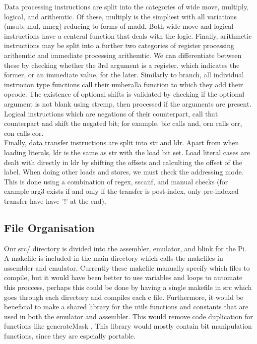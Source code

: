 \documentclass[11pt]{article}
\begin{document}
Data processing instructions are split into the categories of wide move, multiply, logical, and arithemtic. Of these, multiply is the simpliest with all variations (msub, mul, mneg) reducing to forms of madd. Both wide move and logical instructions have a centeral function that deals with the logic. Finally, arithmetic instructions may be split into a further two categories of register processing arithemtic and immediate processing arithemtic. We can differentiate between these by checking whether the 3rd argument is a register, which indicates the former, or an immediate value, for the later. Similarly to branch, all individual instrucion type functions call their umberalla function to which they add their opcode. The existence of optional shifts is validated by checking if the optional argument is not blank using strcmp, then processed if the arguments are present. Logical instructions which are negations of their counterpart, call that counterpart and shift the negated bit; for example, bic calls and, orn calls orr, eon calls eor. \\
Finally, data transfer instructions are split into str and ldr. Apart from when loading literals, ldr is the same as str with the load bit set. Load literal cases are dealt with directly in ldr by shifting the offsets and calculting the offset of the label. When doing other loads and stores, we must check the addressing mode.  This is done using a combination of regex, sscanf, and manual checks (for example arg3 exists if and only if the transfer is post-index, only pre-indexed transfer have have '!' at the end).

\subsection{File Organisation}
Our src/ directory is divided into the assembler, emulator, and blink for the Pi. A makefile is included in the main directory which calls the makefiles in assembler and emulator. Currently these makefile manually specify which files to compile, but it would have been better to use variables and loops to automate this proccess, perhaps this could be done by having a single makefile in src which goes through each directory and compiles each c file. Furthermore, it would be beneficial to make a shared library for the utils functions and constants that are used in both the emulator and assembler. This would remove code duplication for functions like generateMask . This library would mostly contain bit manipulation functions, since they are espcially portable. 
\end{document}
